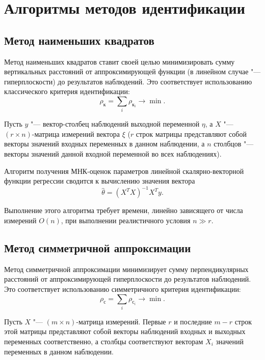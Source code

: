 \section{Алгоритмы методов идентификации}

\subsection{Метод наименьших квадратов}

Метод наименьших квадратов ставит своей целью минимизировать сумму вертикальных расстояний
от аппроксимирующей функции (в линейном случае "--- гиперплоскости) до результатов наблюдений.
Это соответствует использованию классического критерия идентификации:
\begin{equation*}
  \rho_{\text{к}} = \sum_i \rho_{\text{к}_i} \rightarrow \min.
\end{equation*}

Пусть \( y \) "--- вектор-столбец наблюдений выходной переменной \( \eta \),
а \( X \) "--- \( (r \times n) \)-матрица измерений вектора \( \xi \)
(\( r \) строк матрицы представляют собой векторы значений входных переменных в данном наблюдении,
а \( n \) столбцов "--- векторы значений данной входной переменной во всех наблюдениях).

Алгоритм получения МНК-оценок параметров линейной скалярно-векторной функции регрессии сводится
к вычислению значения вектора~\cite{wiki_lse}
\begin{equation*}
  \hat{\theta} = (X^{T}X)^{-1}X^{T} y.
\end{equation*}

Выполнение этого алгоритма требует времени, линейно зависящего от числа измерений \( O(n) \),
при выполнении реалистичного условия \( n \gg r \).

\vspace{2\baselineskip}
\subsection{Метод симметричной аппроксимации}

Метод симметричной аппроксимации минимизирует сумму перпендикулярных расстояний
от аппроксимирующей гиперплоскости до результатов наблюдений.
Это соответствует использованию симметричного критерия идентификации:
\begin{equation*}
  \rho_{\text{с}} = \sum_i \rho_{\text{с}_i} \rightarrow \min.
\end{equation*}

Пусть \( X \) "--- \( (m \times n) \)-матрица измерений.
Первые \( r \) и последние \( m - r \) строк этой матрицы представляют собой векторы наблюдений
входных и выходных переменных соответственно,
а столбцы соответствуют векторам \( X_i \) значений переменных в данном наблюдении.

